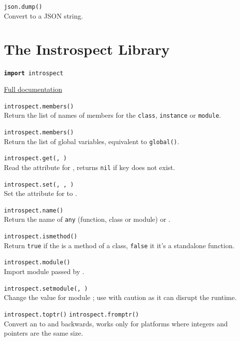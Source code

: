 \hangpar \texttt{json.dump(}\texttt{)} \\
Convert  to a JSON string.

\section*{The Instrospect Library}

\hangpar \texttt{\textbf{import} introspect}

\hangpar \href{https://berry.readthedocs.io/en/latest/source/en/Chapter-7.html\#module-introspect}{Full documentation}

\hangpar \texttt{introspect.members(}\texttt{)} \\
Return the list of names of members for the \texttt{class}, \texttt{instance} or \texttt{module}.

\hangpar \texttt{introspect.members()} \\
Return the list of global variables, equivalent to \texttt{global()}.

\hangpar \texttt{introspect.get(}\texttt{, }\texttt{)} \\
Read the attribute  for , returns \texttt{nil} if key does not exist.

\hangpar \texttt{introspect.set(}\texttt{, }\texttt{, }\texttt{)} \\
Set the attribute  for  to .

\hangpar \texttt{introspect.name(}\texttt{)} \\
Return the name of \texttt{any} (function, class or module) or .

\hangpar \texttt{introspect.ismethod(}\texttt{)} \\
Return \texttt{true} if the  is a method of a class, \texttt{false} it it's a standalone function.

\hangpar \texttt{introspect.module(}\texttt{)} \\
Import module passed by .

\hangpar \texttt{introspect.setmodule(}\texttt{, }\texttt{)} \\
Change the value for module ; use with caution as it can disrupt the runtime.

\hangpar \texttt{introspect.toptr(}\texttt{)}  \texttt{introspect.fromptr(}\texttt{)} \\
Convert an  to  and backwards, works only for platforms where integers and pointers are the same size.

